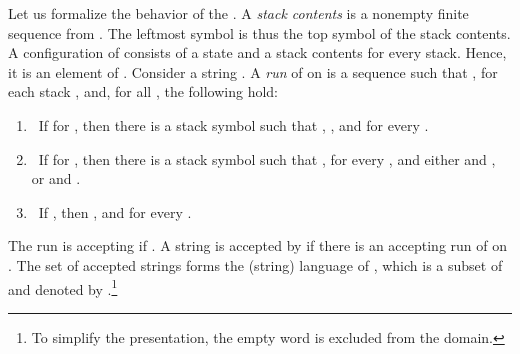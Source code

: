 \documentclass{LMCS}
\begin{document}
Let us formalize the behavior of the \MVPA . A \emph{stack contents} is a
nonempty finite sequence from . The leftmost symbol is thus the top symbol of the stack
contents. A configuration of  consists of a state and a stack contents
for every stack. Hence, it is an element of .
Consider a string . A \emph{run} of  on
 is a sequence 
such that ,  for each stack , and, for all , the following hold:
\begin{enumerate}
\item\noindent{\hskip-11 pt\bf [Push]:}\ If  for , then
  there is a stack symbol  such that
  , , and  for
  every .
\item\noindent{\hskip-11 pt\bf [Pop]:}\ If  for , then
  there is a stack symbol  such that ,  for every , and either  and
  , or  and
  .
\item\noindent{\hskip-11 pt\bf [Internal]:}\ If , then , and  for every .
\end{enumerate}
The run  is accepting if . A string  is
accepted by  if there is an accepting run of  on . The set of
accepted strings forms the (string) language of , which is a subset of
 and denoted by .\footnote{To simplify the presentation, the
  empty word  is excluded from the domain.}
\end{document}
